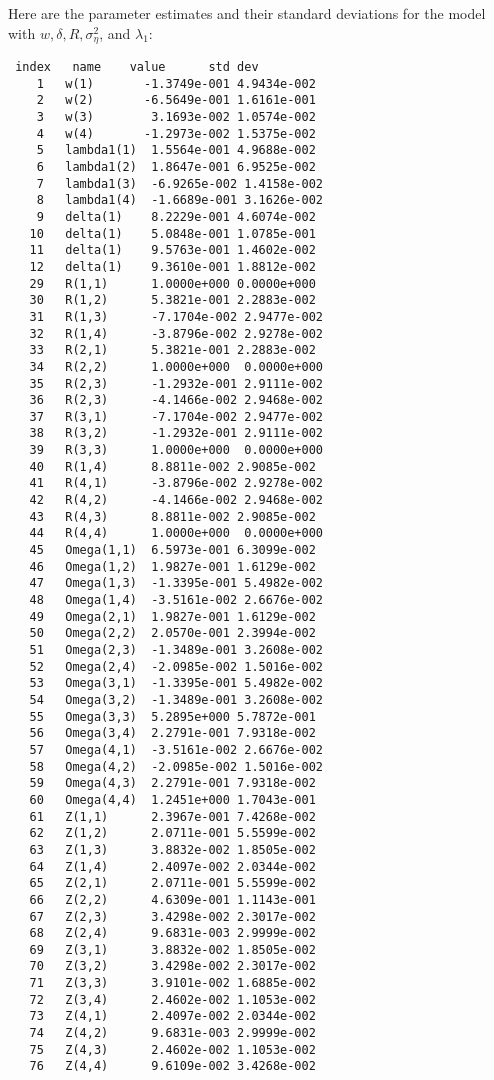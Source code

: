 Here are the parameter estimates and their standard deviations for
the model with $w,\delta,R,\sigma^2_\eta$, and $\lambda_1$:
\begin{lstlisting}
 index   name    value      std dev   
    1   w(1)       -1.3749e-001 4.9434e-002
    2   w(2)       -6.5649e-001 1.6161e-001
    3   w(3)        3.1693e-002 1.0574e-002
    4   w(4)       -1.2973e-002 1.5375e-002
    5   lambda1(1)  1.5564e-001 4.9688e-002
    6   lambda1(2)  1.8647e-001 6.9525e-002
    7   lambda1(3)  -6.9265e-002 1.4158e-002
    8   lambda1(4)  -1.6689e-001 3.1626e-002
    9   delta(1)    8.2229e-001 4.6074e-002
   10   delta(1)    5.0848e-001 1.0785e-001
   11   delta(1)    9.5763e-001 1.4602e-002
   12   delta(1)    9.3610e-001 1.8812e-002
   29   R(1,1)      1.0000e+000 0.0000e+000
   30   R(1,2)      5.3821e-001 2.2883e-002
   31   R(1,3)      -7.1704e-002 2.9477e-002
   32   R(1,4)      -3.8796e-002 2.9278e-002
   33   R(2,1)      5.3821e-001 2.2883e-002
   34   R(2,2)      1.0000e+000  0.0000e+000
   35   R(2,3)      -1.2932e-001 2.9111e-002
   36   R(2,3)      -4.1466e-002 2.9468e-002
   37   R(3,1)      -7.1704e-002 2.9477e-002
   38   R(3,2)      -1.2932e-001 2.9111e-002
   39   R(3,3)      1.0000e+000  0.0000e+000
   40   R(1,4)      8.8811e-002 2.9085e-002
   41   R(4,1)      -3.8796e-002 2.9278e-002
   42   R(4,2)      -4.1466e-002 2.9468e-002
   43   R(4,3)      8.8811e-002 2.9085e-002
   44   R(4,4)      1.0000e+000  0.0000e+000
   45   Omega(1,1)  6.5973e-001 6.3099e-002
   46   Omega(1,2)  1.9827e-001 1.6129e-002
   47   Omega(1,3)  -1.3395e-001 5.4982e-002
   48   Omega(1,4)  -3.5161e-002 2.6676e-002
   49   Omega(2,1)  1.9827e-001 1.6129e-002
   50   Omega(2,2)  2.0570e-001 2.3994e-002
   51   Omega(2,3)  -1.3489e-001 3.2608e-002
   52   Omega(2,4)  -2.0985e-002 1.5016e-002
   53   Omega(3,1)  -1.3395e-001 5.4982e-002
   54   Omega(3,2)  -1.3489e-001 3.2608e-002
   55   Omega(3,3)  5.2895e+000 5.7872e-001
   56   Omega(3,4)  2.2791e-001 7.9318e-002
   57   Omega(4,1)  -3.5161e-002 2.6676e-002
   58   Omega(4,2)  -2.0985e-002 1.5016e-002
   59   Omega(4,3)  2.2791e-001 7.9318e-002
   60   Omega(4,4)  1.2451e+000 1.7043e-001
   61   Z(1,1)      2.3967e-001 7.4268e-002
   62   Z(1,2)      2.0711e-001 5.5599e-002
   63   Z(1,3)      3.8832e-002 1.8505e-002
   64   Z(1,4)      2.4097e-002 2.0344e-002
   65   Z(2,1)      2.0711e-001 5.5599e-002
   66   Z(2,2)      4.6309e-001 1.1143e-001
   67   Z(2,3)      3.4298e-002 2.3017e-002
   68   Z(2,4)      9.6831e-003 2.9999e-002
   69   Z(3,1)      3.8832e-002 1.8505e-002
   70   Z(3,2)      3.4298e-002 2.3017e-002
   71   Z(3,3)      3.9101e-002 1.6885e-002
   72   Z(3,4)      2.4602e-002 1.1053e-002
   73   Z(4,1)      2.4097e-002 2.0344e-002
   74   Z(4,2)      9.6831e-003 2.9999e-002
   75   Z(4,3)      2.4602e-002 1.1053e-002
   76   Z(4,4)      9.6109e-002 3.4268e-002
\end{lstlisting}

